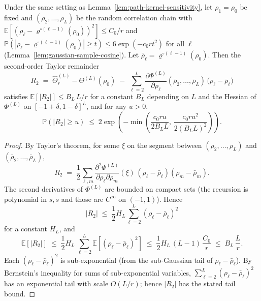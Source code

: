 \begin{lemma}\label{lem:second-order-remainder}
Under the same setting as Lemma~\ref{lem:path-kernel-sensitivity}, let \(\rho_1=\rho_0\) be fixed and \((\rho_2,\ldots,\rho_L)\) be the random correlation chain with \(\mathbb{E}[(\rho_\ell-\varrho^{\circ(\ell-1)}(\rho_0))^2]\le C_0/r\) and \(\mathbb{P}(|\rho_\ell-\varrho^{\circ(\ell-1)}(\rho_0)|\ge t)\le 6\exp(-c_0 r t^2)\) for all \(\ell\) (Lemma~\ref{lem:gaussian-sample-cosine}). Let \(\bar{\rho}_\ell=\varrho^{\circ(\ell-1)}(\rho_0)\). Then the second-order Taylor remainder
\[
R_2 \;=\; \hat{\Theta}^{(L)}_r - \Theta^{(L)}(\rho_0) \;-\; \sum_{\ell=2}^L \frac{\partial\Phi^{(L)}}{\partial\rho_\ell}(\bar{\rho}_2,\ldots,\bar{\rho}_L)\,\bigl(\rho_\ell-\bar{\rho}_\ell\bigr)
\]
satisfies \(\mathbb{E}[|R_2|]\le B_L\,L/r\) for a constant \(B_L\) depending on \(L\) and the Hessian of \(\Phi^{(L)}\) on \([-1+\delta,1-\delta]^L\), and for any \(u>0\),
\[
\mathbb{P}(|R_2|\ge u) \;\le\; 2\exp\!\left(-\min\!\left(\frac{c_0 r u}{2B_L L},\,\frac{c_0 r u^2}{2(B_L L)^2}\right)\right).
\]
\end{lemma}
\begin{proof}
By Taylor's theorem, for some \(\xi\) on the segment between \((\rho_2,\ldots,\rho_L)\) and \((\bar{\rho}_2,\ldots,\bar{\rho}_L)\),
\[
R_2 \;=\; \frac{1}{2}\sum_{\ell,m} \frac{\partial^2\Phi^{(L)}}{\partial\rho_\ell\partial\rho_m}(\xi)\,(\rho_\ell-\bar{\rho}_\ell)(\rho_m-\bar{\rho}_m).
\]
The second derivatives of \(\Phi^{(L)}\) are bounded on compact sets (the recursion is polynomial in \(s,\dot{s}\) and those are \(C^\infty\) on \((-1,1)\)). Hence
\[
|R_2| \;\le\; \frac{1}{2}H_L \sum_{\ell=2}^L (\rho_\ell-\bar{\rho}_\ell)^2
\]
for a constant \(H_L\), and
\[
\mathbb{E}[|R_2|] \;\le\; \frac{1}{2}H_L\,\sum_{\ell=2}^L \mathbb{E}[(\rho_\ell-\bar{\rho}_\ell)^2] \;\le\; \frac{1}{2}H_L\,(L-1)\,\frac{C_0}{r} \;\le\; B_L\,\frac{L}{r}.
\]
Each \((\rho_\ell-\bar{\rho}_\ell)^2\) is sub-exponential (from the sub-Gaussian tail of \(\rho_\ell-\bar{\rho}_\ell\)). By Bernstein's inequality for sums of sub-exponential variables, \(\sum_{\ell=2}^L (\rho_\ell-\bar{\rho}_\ell)^2\) has an exponential tail with scale \(O(L/r)\); hence \(|R_2|\) has the stated tail bound.
\end{proof}

